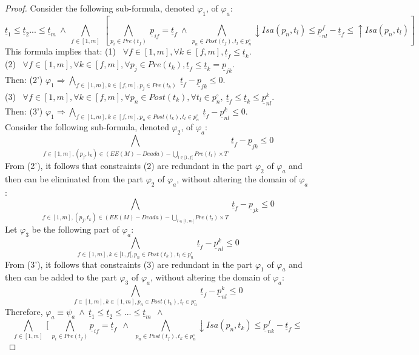 \documentclass[submission,copyright,creativecommons]{eptcs}
\newtheorem{proof}{Proof}
\numberwithin{equation}{section}
\begin{document}
\begin{proof}
Consider the following sub-formula, denoted $\varphi_1$, of $\varphi_a$: $$\underline{t}_1 \leq \underline{t}_2 ... \leq \underline{t}_m  \ \wedge \ \underset{f \in [1,m]} \bigwedge \ [  \underset{p_i \in Pre(t_{f})} \bigwedge \  \underline{p}_{if} = \underline{t}_f \ \wedge \ \underset{p_n \in Post(t_{f}), t_l \in p_n^\circ } \bigwedge {\downarrow Isa(p_{n}, t_l)} \leq \underline{p}_{nl}^f - \underline{t}_{f} \leq
{\uparrow Isa(p_{n},t_l)}]$$
This formula implies that:
(1) \ $\forall f \in [1,m], \forall k \in [f,m], \underline{t}_f \leq \underline{t}_k$. \\
(2) \ $\forall f \in [1,m],\forall k \in [f,m], \forall p_j \in Pre(t_k), \underline{t}_f \leq \underline{t}_k = \underline{p}_{jk}$.\\ Then: (2') $\varphi_1 \Rightarrow \underset{f \in [1,m], k \in [f,m], p_j \in Pre(t_{k})} \bigwedge   \  \underline{t}_{f} - \underline{p}_{jk} \leq 0$.\\
(3) \ $\forall f \in [1,m],\forall k \in [f,m], \forall p_n \in Post(t_k), \forall t_l \in p_n^\circ, \ \underline{t}_f \leq \underline{t}_k \leq \underline{p}_{nl}^k$.\\ Then: (3') $\varphi_1 \Rightarrow \underset{f \in [1,m], k \in [f,m], p_n \in Post(t_{k}), t_l \in p_n^\circ } \bigwedge   \  \underline{t}_{f} - \underline{p}_{nl}^k \leq 0$.\\
Consider the following sub-formula, denoted $\varphi_2$, of $\varphi_a$: $$\underset{f \in [1,m], (p_j,t_k) \in (EE(M) - Deada) - \underset{l \in [1,f[} \bigcup Pre(t_{l}) \times T} \bigwedge   \  \underline{t}_{f} - \underline{p}_{jk} \leq 0$$
From (2'), it follows that constraints (2) are redundant in the part $\varphi_2$ of $\varphi_a$ and then can be eliminated from the part $\varphi_2$ of $\varphi_a$, without altering the domain of $\varphi_a$:
$$\underset{f \in [1,m], (p_j,t_k) \in (EE(M) - Deada) - \underset{l \in [1,m[} \bigcup Pre(t_{l}) \times T} \bigwedge   \  \underline{t}_{f} - \underline{p}_{jk} \leq 0$$
Let $\varphi_3$ be the following part of $\varphi_a$: $$\underset{f \in [1,m], k \in [1,f[, p_n \in Post(t_{k}),t_l \in p_n^\circ } \bigwedge   \  \underline{t}_{f} - \underline{p}_{nl}^k \leq 0$$
From (3'), it follows that constraints (3) are redundant in the part $\varphi_1$ of $\varphi_a$ and then can be added to the part $\varphi_3$ of $\varphi_a$, without altering the domain of $\varphi_a$:
$$\underset{f \in [1,m], k \in [1,m], p_n \in Post(t_{k}), t_l \in p_n^\circ } \bigwedge   \  \underline{t}_{f} - \underline{p}_{nl}^k \leq 0$$
Therefore, $\varphi_a \equiv \psi_a \ \wedge \  \underline{t}_1 \leq \underline{t}_2 \leq ... \leq \underline{t}_m \ \ \wedge \ $ $$ \underset{f \in [1,m]} \bigwedge \ [ \ \underset{p_i \in Pre(t_{f})} \bigwedge  \underline{p}_{if} = \underline{t}_f \ \ \wedge \ \ \underset{p_n \in Post(t_{f}), t_k \in p_n^\circ } \bigwedge {\downarrow Isa(p_{n},t_k)} \leq \underline{p}_{nk}^f - \underline{t}_{f} \leq
$$
\end{proof}
\end{document}
